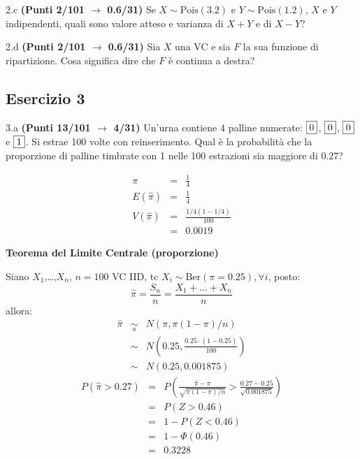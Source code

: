 \documentclass[
  11pt,
]{book}
\theoremstyle{mytheoremstyle}
\theoremstyle{mydefstyle}
\newenvironment{sol}
  {
  \begin{tcolorbox}[enhanced,breakable,arc=0.1mm,boxrule=1pt,colback=white,colframe=iblue,
  title=\bf \fontfamily{lmss}\selectfont \hspace{.5 cm} Soluzione,drop fuzzy shadow]

}{
\end{tcolorbox}
  }
\begin{document}
2.c \textbf{(Punti 2/101 \(\rightarrow\) 0.6/31)} Se \(X\sim\text{Pois}(3.2)\) e \(Y\sim\text{Pois}(1.2)\), \(X\) e \(Y\) indipendenti, quali sono valore atteso e varianza di \(X+Y\) e di \(X-Y\)?

2.d \textbf{(Punti 2/101 \(\rightarrow\) 0.6/31)} Sia \(X\) una VC e sia \(F\) la sua funzione di ripartizione. Cosa significa dire che \(F\) è continua a destra?

\subsection{Esercizio 3}\label{esercizio-3-18}

3.a \textbf{(Punti 13/101 \(\rightarrow\) 4/31)} Un'urna contiene 4 palline numerate: \(\fbox{0}\), \(\fbox{0}\), \(\fbox{0}\) e \(\fbox{1}\). Si estrae 100 volte con reinserimento. Qual è la probabilità che la proporzione di palline timbrate con 1 nelle 100 estrazioni sia maggiore di 0.27?

\begin{sol}
\begin{eqnarray*}
  \pi &=&  \frac 14\\
  E(\hat\pi) &=& \frac 14\\
  V(\hat\pi) &=& \frac {1/4(1-1/4)}{100}\\
  &=& 0.0019
\end{eqnarray*}

\textbf{Teorema del Limite Centrale (proporzione)}

Siano \(X_1\),\ldots,\(X_n\), \(n=100\) VC IID, tc \(X_i\sim\text{Ber}(\pi=0.25)\)\(,\forall i\), posto:
\[
      \hat\pi=\frac{S_n}n = \frac{X_1 + ... + X_n}n
      \]
allora:\begin{eqnarray*}
  \hat\pi & \mathop{\sim}\limits_{a}& N(\pi,\pi(1-\pi)/n) \\
  &\sim & N\left(0.25,\frac{0.25\cdot(1-0.25)}{100}\right) \\
     &\sim & N(0.25,0.001875) 
  \end{eqnarray*}\begin{eqnarray*}
      P( \hat\pi   >   0.27 ) 
        &=& P\left(  \frac { \hat\pi  -  \pi }{ \sqrt{\pi(1-\pi)/n} }  >  \frac { 0.27  -  0.25 }{\sqrt{ 0.001875 }} \right)  \\
                 &=& P\left(  Z   >   0.46 \right) \\    &=& 1-P(Z< 0.46 )\\ 
                 &=&  1-\Phi( 0.46 ) \\ &=&  0.3228 
      \end{eqnarray*}

\end{sol}
\end{document}
